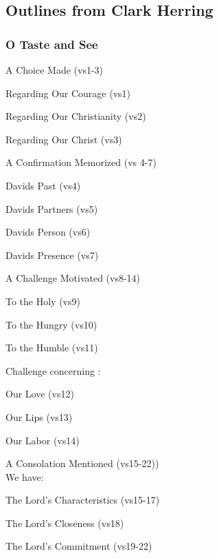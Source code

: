 \subsection{Outlines from Clark Herring}


\subsubsection{O Taste and See}


\begin{compactenum}[I.]
    \item A Choice Made (vs1-3)
    \begin{compactenum}[A.]
		\item Regarding Our Courage (vs1)
		\item Regarding Our Christianity (vs2)
		\item Regarding Our Christ (vs3)
	\end{compactenum}
    \item A Confirmation Memorized (vs 4-7)
    \begin{compactenum}[A.]
		\item Davids Past (vs4)
		\item Davids Partners (vs5)
		\item Davids Person (vs6)
		\item Davids Presence (vs7)
	\end{compactenum}
    \item A Challenge Motivated (vs8-14)\\
    \begin{compactenum}[A.]
		\item To the Holy (vs9)
		\item To the Hungry (vs10)
		\item To the Humble (vs11)
	\end{compactenum}
    Challenge concerning : 
    \begin{compactenum}[1.]
		\item Our Love (vs12)
		\item Our Lips (vs13)
		\item Our Labor (vs14)
	\end{compactenum}
    \item A Consolation Mentioned (vs15-22))\\
    We have:
    \begin{compactenum}[A.]
		\item The Lord’s Characteristics (vs15-17)
		\item The Lord’s Closeness (vs18)
		\item The Lord’s Commitment (vs19-22)
	\end{compactenum}
\end{compactenum}


